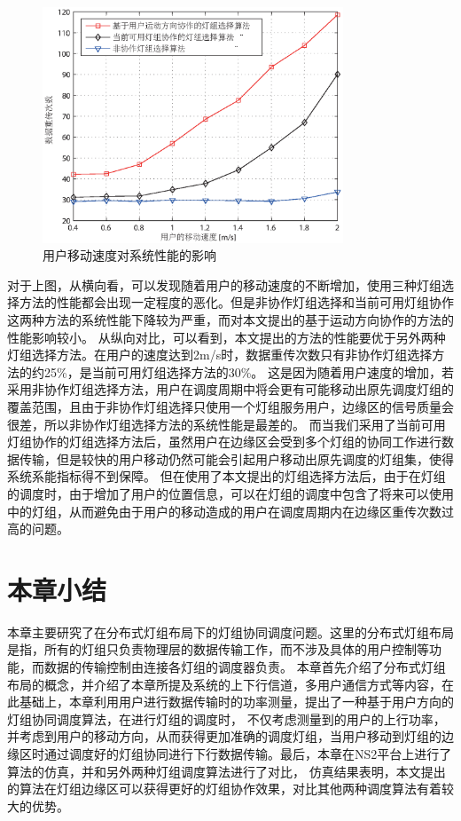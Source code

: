 \begin{figure}[htbp]
    \centering
	\includegraphics[width=0.8\textwidth]{figures/chapter-4/DistributionUserSpeed.eps}
	\caption{用户移动速度对系统性能的影响}
	\label{fig:distribution-user-speed}
\end{figure}

对于上图，从横向看，可以发现随着用户的移动速度的不断增加，使用三种灯组选择方法的性能都会出现一定程度的恶化。但是非协作灯组选择和当前可用灯组协作这两种方法的系统性能下降较为严重，而对本文提出的基于运动方向协作的方法的性能影响较小。
从纵向对比，可以看到，本文提出的方法的性能要优于另外两种灯组选择方法。在用户的速度达到2m/s时，数据重传次数只有非协作灯组选择方法的约25\%，是当前可用灯组选择方法的30\%。
这是因为随着用户速度的增加，若采用非协作灯组选择方法，用户在调度周期中将会更有可能移动出原先调度灯组的覆盖范围，且由于非协作灯组选择只使用一个灯组服务用户，边缘区的信号质量会很差，所以非协作灯组选择方法的系统性能是最差的。
而当我们采用了当前可用灯组协作的灯组选择方法后，虽然用户在边缘区会受到多个灯组的协同工作进行数据传输，但是较快的用户移动仍然可能会引起用户移动出原先调度的灯组集，使得系统系能指标得不到保障。
但在使用了本文提出的灯组选择方法后，由于在灯组的调度时，由于增加了用户的位置信息，可以在灯组的调度中包含了将来可以使用中的灯组，从而避免由于用户的移动造成的用户在调度周期内在边缘区重传次数过高的问题。

\section{本章小结}	
本章主要研究了在分布式灯组布局下的灯组协同调度问题。这里的分布式灯组布局是指，所有的灯组只负责物理层的数据传输工作，而不涉及具体的用户控制等功能，而数据的传输控制由连接各灯组的调度器负责。
本章首先介绍了分布式灯组布局的概念，并介绍了本章所提及系统的上下行信道，多用户通信方式等内容，在此基础上，本章利用用户进行数据传输时的功率测量，提出了一种基于用户方向的灯组协同调度算法，在进行灯组的调度时，
不仅考虑测量到的用户的上行功率，并考虑到用户的移动方向，从而获得更加准确的调度灯组，当用户移动到灯组的边缘区时通过调度好的灯组协同进行下行数据传输。最后，本章在NS2平台上进行了算法的仿真，并和另外两种灯组调度算法进行了对比，
仿真结果表明，本文提出的算法在灯组边缘区可以获得更好的灯组协作效果，对比其他两种调度算法有着较大的优势。
